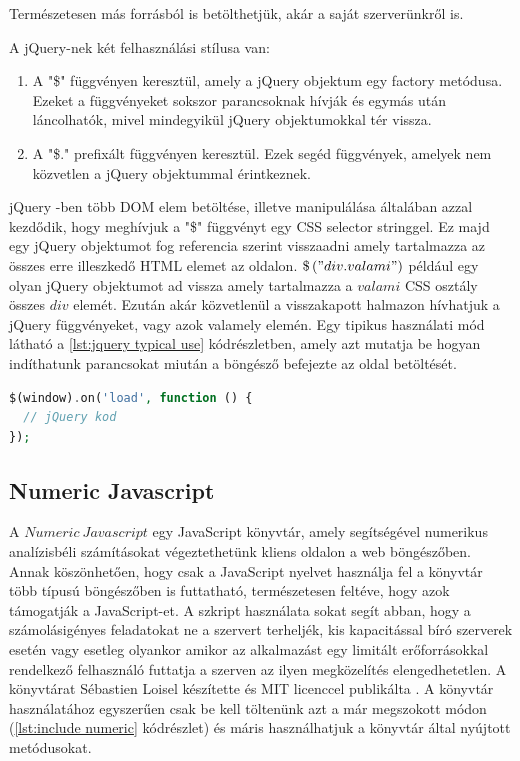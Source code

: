 \documentclass[12pt]{report}
\theoremstyle{definition}
\begin{document}
	Természetesen más forrásból is betölthetjük, akár a saját szerverünkről is. 
	
	A jQuery-nek két felhasználási stílusa van:
	
	\begin{enumerate}
		\item A "\$" függvényen keresztül, amely a jQuery objektum egy factory metódusa. Ezeket a függvényeket sokszor parancsoknak hívják és egymás után láncolhatók, mivel mindegyikül jQuery objektumokkal tér vissza.
		\item A "\$." prefixált függvényen keresztül. Ezek segéd függvények, amelyek nem közvetlen a jQuery objektummal érintkeznek. 
	\end{enumerate}
	
	jQuery -ben több DOM elem betöltése, illetve manipulálása általában azzal kezdődik, hogy meghívjuk a "\$" függvényt egy CSS selector stringgel. Ez majd egy jQuery objektumot fog referencia szerint visszaadni amely tartalmazza az összes erre illeszkedő HTML elemet az oldalon. $\$\left("div.valami"\right)$ például egy olyan jQuery objektumot ad vissza amely tartalmazza a $valami$ CSS osztály összes $div$ elemét. Ezután akár közvetlenül a visszakapott halmazon hívhatjuk a jQuery függvényeket, vagy azok valamely elemén. Egy tipikus használati mód látható a \ref{lst:jquery typical use} kódrészletben, amely azt mutatja be hogyan indíthatunk parancsokat miután a böngésző befejezte az oldal betöltését.
	
	\noindent\begin{minipage}{\linewidth}
		\begin{lstlisting}[language=php,label={lst:jquery typical use}, caption={jQuery tipikus használat}]
$(window).on('load', function () {
  // jQuery kod
});
		\end{lstlisting}
	\end{minipage}
		
	\subsection{Numeric Javascript}
	A $Numeric\ Javascript$ egy JavaScript könyvtár, amely segítségével numerikus analízisbéli számításokat végeztethetünk kliens oldalon a web böngészőben. Annak köszönhetően, hogy csak a JavaScript nyelvet használja fel a könyvtár több típusú böngészőben is futtatható, természetesen feltéve, hogy azok támogatják a JavaScript-et. A szkript használata sokat segít abban, hogy a számolásigényes feladatokat ne a szervert terheljék, kis kapacitással bíró szerverek esetén vagy esetleg olyankor amikor az alkalmazást egy limitált erőforrásokkal rendelkező felhasználó futtatja a szerven az ilyen megközelítés elengedhetetlen. A könyvtárat Sébastien Loisel készítette és MIT licenccel publikálta \cite{numericjs source}. A könyvtár használatához egyszerűen csak be kell töltenünk azt a már megszokott módon (\ref{lst:include numeric} kódrészlet) és máris használhatjuk a könyvtár által nyújtott metódusokat.
	
\end{document}
